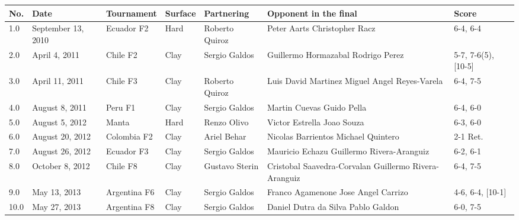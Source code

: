\documentclass{article}
\begin{document}
\begin{tabular}{lllllll}
\toprule
No. & Date & Tournament & Surface & Partnering & Opponent in the final & Score \\
\midrule
1.0 & September 13, 2010 & Ecuador F2 & Hard & Roberto Quiroz & Peter Aarts  Christopher Racz & 6-4, 6-4 \\
2.0 & April 4, 2011 & Chile F2 & Clay & Sergio Galdos & Guillermo Hormazabal  Rodrigo Perez & 5-7, 7-6(5), [10-5] \\
3.0 & April 11, 2011 & Chile F3 & Clay & Roberto Quiroz & Luis David Martinez  Miguel Angel Reyes-Varela & 6-4, 7-5 \\
4.0 & August 8, 2011 & Peru F1 & Clay & Sergio Galdos & Martin Cuevas  Guido Pella & 6-4, 6-0 \\
5.0 & August 5, 2012 & Manta & Hard & Renzo Olivo & Victor Estrella  Joao Souza & 6-3, 6-0 \\
6.0 & August 20, 2012 & Colombia F2 & Clay & Ariel Behar & Nicolas Barrientos  Michael Quintero & 2-1 Ret. \\
7.0 & August 26, 2012 & Ecuador F3 & Clay & Sergio Galdos & Mauricio Echazu  Guillermo Rivera-Aranguiz & 6-2, 6-1 \\
8.0 & October 8, 2012 & Chile F8 & Clay & Gustavo Sterin & Cristobal Saavedra-Corvalan  Guillermo Rivera-Aranguiz & 6-4, 7-5 \\
9.0 & May 13, 2013 & Argentina F6 & Clay & Sergio Galdos & Franco Agamenone  Jose Angel Carrizo & 4-6, 6-4, [10-1] \\
10.0 & May 27, 2013 & Argentina F8 & Clay & Sergio Galdos & Daniel Dutra da Silva  Pablo Galdon & 6-0, 7-5 \\
\bottomrule
\end{tabular}
\end{document}
